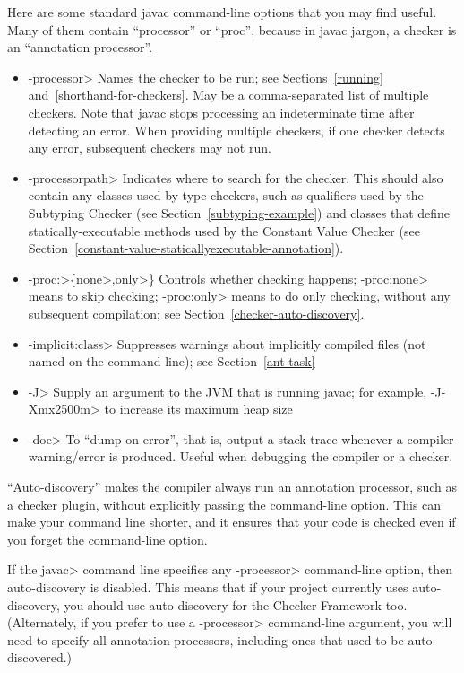 Here are some standard javac command-line options that you may find useful.
Many of them contain ``processor'' or ``proc'', because in javac jargon, a
checker is an ``annotation processor''.

\begin{itemize}
\item \<-processor> Names the checker to be
  run; see Sections~\ref{running} and~\ref{shorthand-for-checkers}.
  May be a comma-separated list of multiple checkers.  Note that javac
  stops processing an indeterminate time after detecting an error.  When
  providing multiple checkers, if one checker detects any error, subsequent
  checkers may not run.
\item \<-processorpath> Indicates where to search for the
  checker.  This should also contain any classes used by type-checkers,
  such as qualifiers used by the Subtyping Checker (see
  Section~\ref{subtyping-example}) and classes that define
  statically-executable methods used by the Constant Value Checker (see
  Section~\ref{constant-value-staticallyexecutable-annotation}).
\item \<-proc:>\{\<none>,\<only>\} Controls whether checking
  happens; \<-proc:none>
  means to skip checking; \<-proc:only> means to do only
  checking, without any subsequent compilation; see
  Section~\ref{checker-auto-discovery}.
\item \<-implicit:class> Suppresses warnings about implicitly compiled files
  (not named on the command line); see Section~\ref{ant-task}
\item \<-J> Supply an argument to the JVM that is running javac;
  for example, \<-J-Xmx2500m> to increase its maximum heap size
\item \<-doe> To ``dump on error'', that is, output a stack trace
  whenever a compiler warning/error is produced. Useful when debugging
  the compiler or a checker.
\end{itemize}



``Auto-discovery'' makes the  compiler always run an
annotation processor, such as a checker
plugin, without explicitly passing the 
command-line option.  This can make your command line shorter, and it ensures
that your code is checked even if you forget the command-line option.

If the \<javac> command line specifies any \<-processor> command-line
option, then auto-discovery is disabled.  This means that if your project
currently uses auto-discovery, you should use auto-discovery for the
Checker Framework too.  (Alternately, if you prefer to use a \<-processor>
command-line argument, you will need to specify all annotation processors,
including ones that used to be auto-discovered.)

